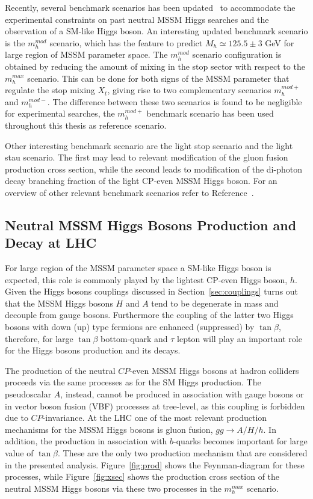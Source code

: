 Recently, several benchmark scenarios has been updated~\cite{LHCxsec} to  
accommodate the experimental constraints on past neutral MSSM Higgs searches and the observation of a SM-like Higgs boson.
An interesting updated benchmark scenario is the $m_h^{mod}$ scenario, which has the feature to predict $M_h \simeq 125.5 \pm 3 $ GeV 
for large region of MSSM parameter space.  The $m_h^{mod}$ scenario configuration is obtained by reducing the amount 
of mixing in the stop sector with respect to  the  $m_h^{max}$ scenario. This can be done for both signs of the MSSM parameter that 
regulate the stop mixing $X_t$, giving rise to two complementary scenarios $m_h^{mod+}$ and $m_h^{mod-}$.
The difference between these two scenarios is found to be negligible for experimental searches, the $m_h^{mod+}$ 
benchmark scenario has been used throughout this thesis as reference scenario.

Other interesting benchmark scenario are the light stop scenario and the light stau scenario.
The first may lead to relevant modification of the gluon fusion production cross section, while the second leads
to modification of the di-photon decay branching fraction of the light CP-even MSSM Higgs boson.
For an overview of other relevant  benchmark scenarios refer to Reference~\cite{LHCxsec}. 



 


\subsection{Neutral MSSM Higgs Bosons Production and Decay at LHC}
For large region of the MSSM parameter space a SM-like Higgs boson is expected, 
this role is commonly played by the lightest CP-even Higgs boson, $h$. 
Given the Higgs bosons couplings discussed in Section~\ref{sec:couplings} turns out that the MSSM Higgs bosons $H$ and $A$
tend to be degenerate in mass and decouple from gauge bosons. Furthermore the coupling of the latter
two Higgs bosons with down (up) type fermions are enhanced (suppressed) by $\tan\beta$, therefore, for large $\tan\beta$
bottom-quark and $\tau$ lepton will play an important role for 
the Higgs bosons production and its decays.  

The production of the neutral $CP$-even MSSM Higgs bosons at hadron
colliders proceeds via the same processes as for the SM Higgs
production. The pseudoscalar $A$, instead, cannot be produced
in association with gauge bosons or in vector boson fusion (VBF) processes at
tree-level, as this coupling is forbidden due to $CP$-invariance.  At
the LHC one of the most relevant production mechanisms for the MSSM
Higgs bosons is gluon fusion, $gg\rightarrow A/H/h$. In
addition, the production in association with $b$-quarks becomes
important for large value of $\tan\beta$. These are the only two production mechanism
that are considered in the presented analysis. Figure~\ref{fig:prod} shows the Feynman-diagram
for these processes, while Figure~\ref{fig:xsec} shows the production cross section of the neutral 
MSSM Higgs bosons via these two processes in the $m_h^{max}$ scenario.


